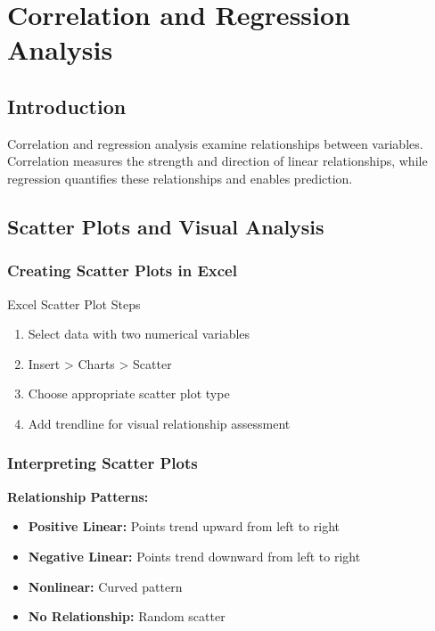 \documentclass[12pt,a4paper]{book}
\begin{document}
\chapter{Correlation and Regression Analysis}

\section{Introduction}

Correlation and regression analysis examine relationships between variables. Correlation measures the strength and direction of linear relationships, while regression quantifies these relationships and enables prediction.

\section{Scatter Plots and Visual Analysis}

\subsection{Creating Scatter Plots in Excel}

\begin{example}{Excel Scatter Plot Steps}
\begin{enumerate}
    \item Select data with two numerical variables
    \item Insert > Charts > Scatter
    \item Choose appropriate scatter plot type
    \item Add trendline for visual relationship assessment
\end{enumerate}
\end{example}

\subsection{Interpreting Scatter Plots}

\textbf{Relationship Patterns:}
\begin{itemize}
    \item \textbf{Positive Linear:} Points trend upward from left to right
    \item \textbf{Negative Linear:} Points trend downward from left to right
    \item \textbf{Nonlinear:} Curved pattern
    \item \textbf{No Relationship:} Random scatter
\end{itemize}
\end{document}
